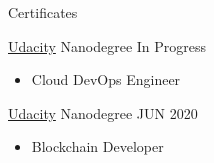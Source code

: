 \documentclass[]{mcdowellcv}
\begin{document}
	\begin{cvsection}{Certificates}		\begin{cvsubsection}{\href{https://www.udacity.com/course/cloud-dev-ops-nanodegree--nd9991}{Udacity}}
			{Nanodegree}
			{In Progress}
			\begin{itemize}
				\item Cloud DevOps Engineer
			\end{itemize}
		\end{cvsubsection}
		\begin{cvsubsection}{\href{https://graduation.udacity.com/confirm/DTZZCCYZ}{Udacity}}
			{Nanodegree}
			{JUN 2020}
			\begin{itemize}
				\item Blockchain Developer
			\end{itemize}
		\end{cvsubsection}
		

\end{cvsection}
\end{document}
